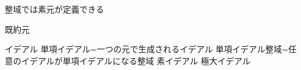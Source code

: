 
    整域では素元が定義できる
    \AAAAAAAA
    \AAAAAAAA

    既約元

    イデアル
    単項イデアル=一つの元で生成されるイデアル
    単項イデアル整域=任意のイデアルが単項イデアルになる整域
    素イデアル
    極大イデアル
